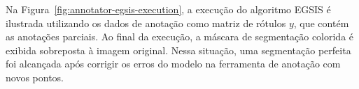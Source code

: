 \begin{figure}[h!]
        \captionsetup{width=16cm}
		\centering
\end{figure}
\FloatBarrier{}

Na Figura~\ref{fig:annotator-egsis-execution}, a execução do algoritmo
EGSIS é ilustrada utilizando os dados de anotação como matriz de
rótulos $y$, que contém as anotações parciais. Ao final da execução, a
máscara de segmentação colorida é exibida sobreposta à imagem
original. Nessa situação, uma segmentação perfeita foi alcançada após
corrigir os erros do modelo na ferramenta de anotação com novos
pontos.
